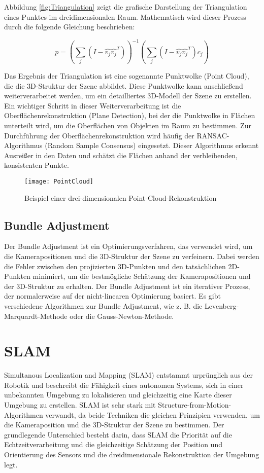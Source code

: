 Abbildung \ref{fig:Triangulation} zeigt die grafische Darstellung der Triangulation eines Punktes im dreidimensionalen Raum. Mathematisch wird dieser Prozess durch die folgende Gleichung beschrieben:

\[
p = \left( \sum_j \left( I - \hat{v_j} \hat{v_j}^T \right) \right)^{-1} \left( \sum_j \left( I - \hat{v_j} \hat{v_j}^T \right) c_j \right)
\]

Das Ergebnis der Triangulation ist eine sogenannte Punktwolke (Point Cloud), die die 3D-Struktur der Szene abbildet. Diese Punktwolke kann anschließend weiterverarbeitet werden, um ein detailliertes 3D-Modell der Szene zu erstellen. Ein wichtiger Schritt in dieser Weiterverarbeitung ist die Oberflächenrekonstruktion (Plane Detection), bei der die Punktwolke in Flächen unterteilt wird, um die Oberflächen von Objekten im Raum zu bestimmen. Zur Durchführung der Oberflächenrekonstruktion wird häufig der RANSAC-Algorithmus (Random Sample Consensus) eingesetzt. Dieser Algorithmus erkennt Ausreißer in den Daten und schätzt die Flächen anhand der verbleibenden, konsistenten Punkte.

\begin{figure}
    \centering
    \texttt{[image: PointCloud]}
    \caption{Beispiel einer drei-dimensionalen Point-Cloud-Rekonstruktion\label{fig:PointCloud}}\par
\end{figure}

\subsection{Bundle Adjustment}

Der Bundle Adjustment ist ein Optimierungsverfahren, das verwendet wird, um die Kamerapositionen und die 3D-Struktur der Szene zu verfeinern. Dabei werden die Fehler zwischen den projizierten 3D-Punkten und den tatsächlichen 2D-Punkten minimiert, um die bestmögliche Schätzung der Kamerapositionen und der 3D-Struktur zu erhalten. Der Bundle Adjustment ist ein iterativer Prozess, der normalerweise auf der nicht-linearen Optimierung basiert. Es gibt verschiedene Algorithmen zur Bundle Adjustment, wie z. B. die Levenberg-Marquardt-Methode oder die Gauss-Newton-Methode.

\section{SLAM}\label{SLAM}

Simultanous Localization and Mapping (SLAM) entstammt urprünglich aus der Robotik und beschreibt die Fähigkeit eines autonomen Systems, sich in einer unbekannten Umgebung zu lokalisieren und gleichzeitig eine Karte dieser Umgebung zu erstellen. SLAM ist sehr stark mit Structure-from-Motion-Algorithmen verwandt, da beide Techniken die gleichen Prinzipien verwenden, um die Kameraposition und die 3D-Struktur der Szene zu bestimmen. Der grundlegende Unterschied besteht darin, dass SLAM die Priorität auf die Echtzeitverarbeitung und die gleichzeitige Schätzung der Position und Orientierung des Sensors und die dreidimensionale Rekonstruktion der Umgebung legt. 

